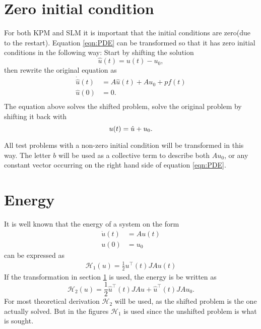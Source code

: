 \section{Zero initial condition}%
\label{sec:inittransf}
For both KPM and SLM it is important that the initial conditions are zero(due to the restart). Equation \eqref{eqn:PDE} can be transformed so that it has zero initial conditions in the following way:
Start by shifting the solution
\begin{equation*}
\hat{u}(t) = u(t)-u_0,
\end{equation*}
then rewrite the original equation as
\begin{equation*}
\begin{aligned}
\dot{\hat{u}}(t) &= A \hat{u}(t) +A u_0 + p f(t) \\
 \hat{u}(0)&= 0. \\
\end{aligned}
\end{equation*}
The equation above solves the shifted problem, solve the original problem by shifting it back with
\begin{equation*}
 u(t) = \hat{u} + u_0. \\
\end{equation*}


All test problems with a non-zero initial condition will be transformed in this way. The letter $b$ will be used as a collective term to describe both $A u_0$, or any constant vector occurring on the right hand side of equation \eqref{eqn:PDE}.

\section{Energy}%
It is well known that the energy of a system on the form
\begin{equation}
\begin{aligned}
\dot{u}(t) &= A u(t) \\
u(0) &= u_0
\end{aligned}
\end{equation}
can be expressed as \cite{!!!!!!!!!!!!!!!!!!!!!!!}
\begin{equation}
\begin{aligned}
\mathcal{H}_1(u) = \frac{1}{2} u^\top (t) J A u(t)
\end{aligned}
\end{equation}
If the transformation in section \ref{sec:inittransf} is used, the energy is be written as
\begin{equation}
\mathcal{H}_2 (u) = \frac{1}{2} \hat{u}^\top (t)  J A \hat{u} + \hat{u}^\top (t)  J A u_0.
\label{eqn:energy2}
\end{equation}
For most theoretical derivation $\mathcal{H}_2$ will be used, as the shifted problem is the one actually solved. But in the figures $\mathcal{H}_1$ is used since the unshifted problem is what is sought.

